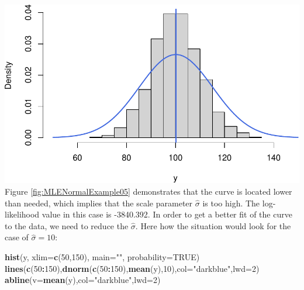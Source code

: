 \documentclass[
]{book}
\newenvironment{Shaded}{\begin{snugshade}}{\end{snugshade}}
\newcommand{\DataTypeTok}[1]{\textcolor[rgb]{0.13,0.29,0.53}{#1}}
\newcommand{\DecValTok}[1]{\textcolor[rgb]{0.00,0.00,0.81}{#1}}
\newcommand{\KeywordTok}[1]{\textcolor[rgb]{0.13,0.29,0.53}{\textbf{#1}}}
\newcommand{\NormalTok}[1]{#1}
\newcommand{\OperatorTok}[1]{\textcolor[rgb]{0.81,0.36,0.00}{\textbf{#1}}}
\newcommand{\OtherTok}[1]{\textcolor[rgb]{0.56,0.35,0.01}{#1}}
\newcommand{\StringTok}[1]{\textcolor[rgb]{0.31,0.60,0.02}{#1}}
\theoremstyle{definition}
\theoremstyle{definition}
\theoremstyle{definition}
\theoremstyle{definition}
\theoremstyle{remark}
\begin{document}
\includegraphics{Svetunkov---Statistics-for-Business-Analytics_files/figure-latex/MLENormalExample05-1.pdf}
Figure \ref{fig:MLENormalExample05} demonstrates that the curve is located lower than needed, which implies that the scale parameter \(\hat{\sigma}\) is too high. The log-likelihood value in this case is -3840.392. In order to get a better fit of the curve to the data, we need to reduce the \(\hat{\sigma}\). Here how the situation would look for the case of \(\hat{\sigma}=10\):

\begin{Shaded}
\begin{Highlighting}[]
\KeywordTok{hist}\NormalTok{(y, }\DataTypeTok{xlim=}\KeywordTok{c}\NormalTok{(}\DecValTok{50}\NormalTok{,}\DecValTok{150}\NormalTok{), }\DataTypeTok{main=}\StringTok{""}\NormalTok{, }\DataTypeTok{probability=}\OtherTok{TRUE}\NormalTok{)}
\KeywordTok{lines}\NormalTok{(}\KeywordTok{c}\NormalTok{(}\DecValTok{50}\OperatorTok{:}\DecValTok{150}\NormalTok{),}\KeywordTok{dnorm}\NormalTok{(}\KeywordTok{c}\NormalTok{(}\DecValTok{50}\OperatorTok{:}\DecValTok{150}\NormalTok{),}\KeywordTok{mean}\NormalTok{(y),}\DecValTok{10}\NormalTok{),}\DataTypeTok{col=}\StringTok{"darkblue"}\NormalTok{,}\DataTypeTok{lwd=}\DecValTok{2}\NormalTok{)}
\KeywordTok{abline}\NormalTok{(}\DataTypeTok{v=}\KeywordTok{mean}\NormalTok{(y),}\DataTypeTok{col=}\StringTok{"darkblue"}\NormalTok{,}\DataTypeTok{lwd=}\DecValTok{2}\NormalTok{)}
\end{Highlighting}
\end{Shaded}
\end{document}
